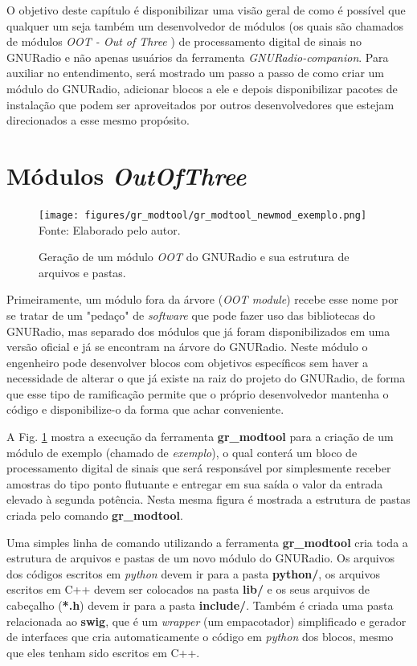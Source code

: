 \documentclass[
  12pt,				%
  openright,			%
  twoside,			%
  a4paper,			%
  english,			%
  french,				%
  spanish,			%
  brazil,				%
  ]{abntex2}
\begin{document}
O objetivo deste capítulo é disponibilizar uma visão geral de como é possível que qualquer um seja também um desenvolvedor de módulos (os quais são chamados de módulos \textit{OOT - Out of Three} \cite{GNURADIO-oot-modules})
de processamento digital de sinais no GNURadio e não apenas usuários da ferramenta \textit{GNURadio-companion}. Para auxiliar no entendimento, será mostrado um passo a passo de como criar
um módulo do GNURadio, adicionar blocos a ele e depois disponibilizar pacotes de instalação que podem ser aproveitados por outros desenvolvedores que estejam direcionados a esse mesmo propósito.

\section*{Módulos \textit{OutOfThree}} \label{section:modules_oot}

\begin{figure}[!htb]
  \centering
  \caption{Geração de um módulo \textit{OOT} do GNURadio e sua estrutura de arquivos e pastas.}
  \texttt{[image: figures/gr\_modtool/gr\_modtool\_newmod\_exemplo.png]}
  Fonte: Elaborado pelo autor.
  \label{fig:gr_modtool_newmod_exemplo}
\end{figure}

Primeiramente, um módulo fora da árvore (\textit{OOT module}) recebe esse nome por se tratar de um "pedaço" de \textit{software} que pode fazer uso das bibliotecas do GNURadio, mas separado dos
módulos que já foram disponibilizados em uma versão oficial e já se encontram na árvore do GNURadio. Neste módulo o engenheiro pode desenvolver blocos com objetivos específicos sem haver a necessidade
de alterar o que já existe na raiz do projeto do GNURadio, de forma que esse tipo de ramificação permite que o próprio desenvolvedor mantenha o código e disponibilize-o da forma que achar conveniente.

A Fig. \ref{fig:gr_modtool_newmod_exemplo} mostra a execução da ferramenta \textbf{gr\_modtool} para a criação de um módulo de exemplo (chamado de \textit{exemplo}), o qual conterá um
bloco de processamento digital  de sinais que será responsável por simplesmente receber amostras do tipo ponto flutuante e entregar em sua saída o valor da entrada elevado à segunda potência.
Nesta mesma figura é mostrada a estrutura de pastas criada pelo comando \textbf{gr\_modtool}.

Uma simples linha de comando utilizando a ferramenta \textbf{gr\_modtool} cria toda a estrutura de arquivos e pastas de um novo módulo do GNURadio. Os arquivos dos códigos escritos em
\textit{python} devem ir para a pasta \textbf{python/}, os arquivos escritos em C++ devem ser colocados na pasta \textbf{lib/} e os seus arquivos de cabeçalho (\textbf{*.h}) devem ir para a pasta
\textbf{include/}. Também é criada uma pasta relacionada ao \textbf{swig}, que é um \textit{wrapper} (um empacotador) simplificado e gerador de interfaces que cria automaticamente o
código em \textit{python} dos blocos, mesmo que eles tenham sido escritos em C++.
\end{document}
